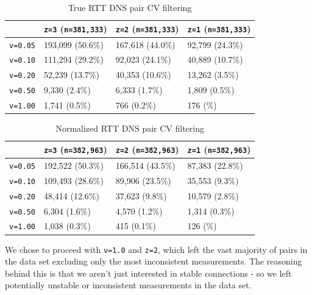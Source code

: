 \begin{table}[htb]
    \centering
    \begin{tabular}{p{1.6cm}|p{4cm}|p{4cm}|p{4cm}}
         & \texttt{z=3} (\texttt{n=381,333}) & \texttt{z=2} (\texttt{n=381,333}) & \texttt{z=1} (\texttt{n=381,333}) \\
        \hline
        \texttt{v=0.05} & 193,099 (50.6\%)  & 167,618 (44.0\%) & ‭92,799 (24.3\%) \\
        \texttt{v=0.10} & 111,294 (29.2\%) & 92,023 (24.1\%) & 40,889 (10.7\%)‬\\
        \texttt{v=0.20} & 52,239 (13.7\%) &  40,353 (10.6\%) & 13,262 (3.5\%)\\
        \texttt{v=0.50} & 9,330 (2.4\%) &  6,333 (1.7\%) & 1,809 (0.5\%)\\
        \texttt{v=1.00} & 1,741 (0.5\%) &    766 (0.2\%) & 176 (\textapprox0.0\%) \\
        \hline
    \end{tabular}
    \caption{True RTT DNS pair CV filtering}
    \label{tab:dns_unnorm_cv_filtering}
\end{table}

\begin{table}[htb]
    \centering
    \begin{tabular}{p{1.6cm}|p{4cm}|p{4cm}|p{4cm}}
         & \texttt{z=3} (\texttt{n=382,963}) & \texttt{z=2} (\texttt{n=382,963}) & \texttt{z=1} (\texttt{n=382,963}) \\
        \hline
        \texttt{v=0.05} & 192,522 (50.3\%) & 166,514 (43.5\%) & 87,383 (22.8\%) \\
        \texttt{v=0.10} & 109,493 (28.6\%) & 89,906 (23.5\%) & 35,553 (9.3\%) \\
        \texttt{v=0.20} & 48,414 (12.6\%) & 37,623 (9.8\%) & 10,579 (2.8\%) \\
        \texttt{v=0.50} & 6,304 (1.6\%) & 4,570 (1.2\%) & 1,314 (0.3\%) \\
        \texttt{v=1.00} & 1,038 (0.3\%) &    415 (0.1\%) & 126 (\textapprox0.0\%) \\  
    \end{tabular}
    \caption{Normalized RTT DNS pair CV filtering}
    \label{tab:dns_norm_cv_filtering}
\end{table}

We chose to proceed with \texttt{v=1.0} and \texttt{z=2}, which left the vast majority of pairs in the data set excluding only the most inconsistent measurements. The reasoning behind this is that we aren't just interested in stable connections - so we left potentially unstable or inconsistent measurements in the data set.

